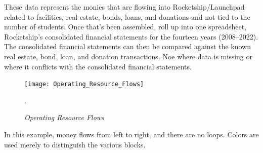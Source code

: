 These data represent the monies that are flowing into Rocketship/Launchpad related to facilities, real estate, bonds, loans, and donations and not tied to the number of students. Once that's been assembled, roll up into one spreadsheet, Rocketship's consolidated financial statements for the fourteen years (2008--2022). The consolidated financial statements can then be compared against the known real estate, bond, loan, and donation transactions. Noe where data is missing or where it conflicts with the consolidated financial statements.

\begin{figure}[ht]
  \centering
  \caption[Operating Resource Flows]{\textit{Operating Resource Flows}}\label{fig:opresflows}
  \texttt{[image: Operating\_Resource\_Flows]}\\
  \footnotesize\raggedright\textcite[16]{Baker.Miron2015}.
\end{figure}
In this example, money flows from left to right, and there are no loops. Colors are used merely to distinguish the various blocks.

